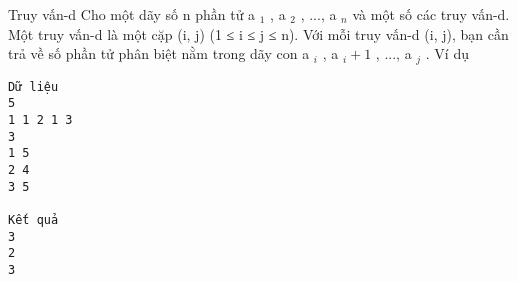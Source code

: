 Truy vấn-d
Cho một dãy số n phần tử a   $_    1   $   ,   a   $_    2   $   , ..., a   $_    n   $   và một số các truy vấn-d. Một truy vấn-d là một cặp (i, j) (1 ≤ i   ≤ j ≤ n). Với mỗi truy vấn-d (i, j), bạn cần trả về số phần   tử phân biệt nằm trong dãy con a   $_    i   $   ,   a   $_    i+1   $   , ..., a   $_    j   $   .
Ví dụ
\begin{verbatim}
Dữ liệu
5
1 1 2 1 3
3
1 5
2 4
3 5

Kết quả
3
2
3 
\end{verbatim}